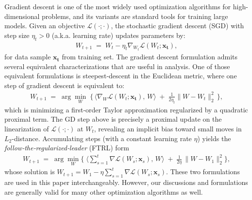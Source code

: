  Gradient descent is one of the most widely used optimization algorithms for high-dimensional problems, and its variants are standard tools for training large models. Given an objective $\mathcal{L}(\cdot; \cdot)$, the stochastic gradient descent (SGD) with step size $\eta_t > 0$ (a.k.a. learning rate) updates parameters by:
\begin{align}
    W_{t+1} \;=\; W_t - \eta_t \nabla_{W_t} \mathcal{L}(W_t; \boldsymbol{x_t}),
\end{align}
for data sample $\boldsymbol{x_t}$ from training set. The gradient descent formulation admits several equivalent characterizations that are useful in analysis. One of those equivalent formulations  is steepest‑descent in the Euclidean metric, where one step of gradient descent is equivalent to:
\begin{align}
    W_{t+1} \;=\; \arg\min_{W}\;\Big\{\,
\langle \nabla_{W} \mathcal{L}(W_t; \boldsymbol{x_t}),\, W \rangle \;+\; \tfrac{1}{2\eta_t}\|W-W_t\|_2^2
\,\Big\},
\end{align}
which is  minimizing a first‑order Taylor approximation regularized by a quadratic proximal term. The  GD step above is precisely a proximal update on the linearization of $\mathcal{L}(\cdot; \cdot)$ at $W_t$, revealing an implicit bias toward small moves in $L_2$-distance. Accumulating steps (with a constant learning rate $\eta$) yields the \emph{follow‑the‑regularized‑leader} (\textsc{FTRL}) form
\begin{align}
    W_{t+1} \;=\;
\arg\min_{W} \Big\{\;\bigg\langle \sum_{s=1}^{t} \nabla \mathcal{L}(W_s; \boldsymbol{x}_s),\, W \bigg\rangle
\;+\; \frac{1}{2\eta}\,\|W-W_1\|_2^2\Big\},
\end{align}
whose solution is $W_{t+1}=W_1-\eta\sum_{s=1}^{t}\nabla \mathcal{L}(W_s; \boldsymbol{x}_s)$. These two formulations are used in this paper interchangeably. However,   our discussions and formulations are generally valid for many other optimization algorithms as well.


